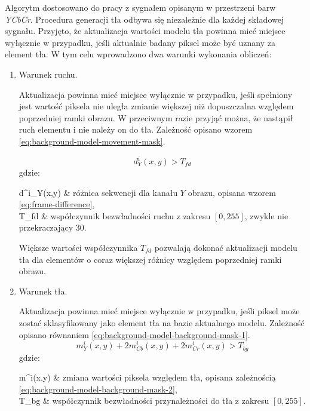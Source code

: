Algorytm dostosowano do pracy z sygnałem opisanym w przestrzeni barw \textit{YCbCr}. 
Procedura generacji tła odbywa się niezależnie dla każdej składowej sygnału.
Przyjęto, że aktualizacja wartości modelu tła powinna mieć miejsce wyłącznie w przypadku, jeśli aktualnie badany piksel może być uznany za element tła. 
W tym celu wprowadzono dwa warunki wykonania obliczeń:
\begin{enumerate}
	\item Warunek ruchu.
	
	Aktualizacja powinna mieć miejsce wyłącznie w przypadku, jeśli spełniony jest wartość piksela nie uległa zmianie większej niż dopuszczalna względem poprzedniej ramki obrazu. %
	W przeciwnym razie przyjąć można, że nastąpił ruch elementu i nie należy on do tła. %
	Zależność opisano wzorem \eqref{eq:background-model-movement-mask}.
	
	\begin{equation}
	\label{eq:background-model-movement-mask}
	d^i_Y(x,y) > T_{fd}
	\end{equation}
	gdzie:
	\begin{conditions}
		d^i_Y(x,y) & różnica sekwencji dla kanału $Y$ obrazu, opisana wzorem \eqref{eq:frame-difference}, \\ %
		T_{fd} & współczynnik bezwładności ruchu z zakresu $[0,255]$, zwykle nie przekraczający $30$. %
	\end{conditions}

	Większe wartości współczynnika $T_{fd}$ pozwalają dokonać aktualizacji modelu tła dla elementów o coraz większej różnicy względem poprzedniej ramki obrazu.
	
	\item Warunek tła.
	
	Aktualizacja powinna mieć miejsce wyłącznie w przypadku, jeśli piksel może zostać sklasyfikowany jako element tła na bazie aktualnego modelu.
	Zależność opisano równaniem \eqref{eq:background-model-background-mask-1}.
	\begin{equation}
	\label{eq:background-model-background-mask-1}
	m^i_Y(x,y) + 2m^i_{Cb}(x,y) + 2m^i_{Cr}(x,y) > T_{bg}
	\end{equation}
	gdzie:
	\begin{conditions}
		m^i(x,y) & zmiana wartości piksela względem tła, opisana zależnością \ref{eq:background-model-background-mask-2}, \\
		T_{bg} & współczynnik bezwładności przynależności do tła z zakresu $[0,255]$. \\
	\end{conditions}
	

\end{enumerate}
